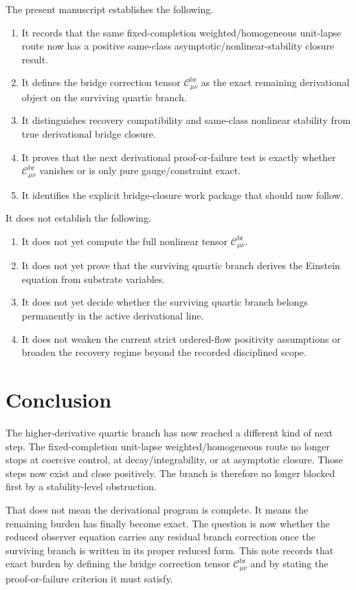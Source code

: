 \documentclass[11pt]{article}
\begin{document}
The present manuscript establishes the following.
\begin{enumerate}
    \item It records that the same fixed-completion weighted/homogeneous unit-lapse route now has a positive same-class asymptotic/nonlinear-stability closure result.
    \item It defines the bridge correction tensor \(\mathcal C_{\mu\nu}^{\mathrm{br}}\) as the exact remaining derivational object on the surviving quartic branch.
    \item It distinguishes recovery compatibility and same-class nonlinear stability from true derivational bridge closure.
    \item It proves that the next derivational proof-or-failure test is exactly whether \(\mathcal C_{\mu\nu}^{\mathrm{br}}\) vanishes or is only pure gauge/constraint exact.
    \item It identifies the explicit bridge-closure work package that should now follow.
\end{enumerate}

It does not establish the following.
\begin{enumerate}
    \item It does not yet compute the full nonlinear tensor \(\mathcal C_{\mu\nu}^{\mathrm{br}}\).
    \item It does not yet prove that the surviving quartic branch derives the Einstein equation from substrate variables.
    \item It does not yet decide whether the surviving quartic branch belongs permanently in the active derivational line.
    \item It does not weaken the current strict ordered-flow positivity assumptions or broaden the recovery regime beyond the recorded disciplined scope.
\end{enumerate}

\section{Conclusion}

The higher-derivative quartic branch has now reached a different kind of next step. The fixed-completion unit-lapse weighted/homogeneous route no longer stops at coercive control, at decay/integrability, or at asymptotic closure. Those steps now exist and close positively. The branch is therefore no longer blocked first by a stability-level obstruction.

That does not mean the derivational program is complete. It means the remaining burden has finally become exact. The question is now whether the reduced observer equation carries any residual branch correction once the surviving branch is written in its proper reduced form. This note records that exact burden by defining the bridge correction tensor \(\mathcal C_{\mu\nu}^{\mathrm{br}}\) and by stating the proof-or-failure criterion it must satisfy.
\end{document}
